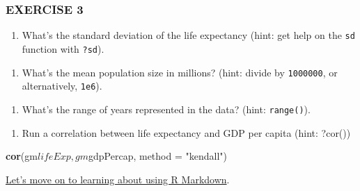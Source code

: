 \documentclass[]{article}
\newenvironment{Shaded}{\begin{snugshade}}{\end{snugshade}}
\newcommand{\KeywordTok}[1]{\textcolor[rgb]{0.13,0.29,0.53}{\textbf{{#1}}}}
\newcommand{\DataTypeTok}[1]{\textcolor[rgb]{0.13,0.29,0.53}{{#1}}}
\newcommand{\FloatTok}[1]{\textcolor[rgb]{0.00,0.00,0.81}{{#1}}}
\newcommand{\StringTok}[1]{\textcolor[rgb]{0.31,0.60,0.02}{{#1}}}
\newcommand{\OtherTok}[1]{\textcolor[rgb]{0.56,0.35,0.01}{{#1}}}
\newcommand{\NormalTok}[1]{{#1}}
\providecommand{\tightlist}{%
  \setlength{\itemsep}{0pt}\setlength{\parskip}{0pt}}
\begin{document}
\subsubsection{EXERCISE 3}\label{exercise-3}

\begin{enumerate}
\def\labelenumi{\arabic{enumi}.}
\tightlist
\item
  What's the standard deviation of the life expectancy (hint: get help
  on the \texttt{sd} function with \texttt{?sd}).
\end{enumerate}

\begin{Shaded}
\end{Shaded}

\begin{enumerate}
\def\labelenumi{\arabic{enumi}.}
\setcounter{enumi}{1}
\tightlist
\item
  What's the mean population size in millions? (hint: divide by
  \texttt{1000000}, or alternatively, \texttt{1e6}).
\end{enumerate}

\begin{Shaded}
\end{Shaded}

\begin{enumerate}
\def\labelenumi{\arabic{enumi}.}
\setcounter{enumi}{2}
\tightlist
\item
  What's the range of years represented in the data? (hint:
  \texttt{range()}).
\end{enumerate}

\begin{Shaded}
\end{Shaded}

\begin{enumerate}
\def\labelenumi{\arabic{enumi}.}
\setcounter{enumi}{3}
\tightlist
\item
  Run a correlation between life expectancy and GDP per capita (hint:
  ?cor())
\end{enumerate}

\begin{Shaded}
\begin{Highlighting}[]
 \KeywordTok{cor}\NormalTok{(gm$lifeExp, gm$gdpPercap, }\DataTypeTok{method =} \StringTok{"kendall"}\NormalTok{)}
\end{Highlighting}
\end{Shaded}

\href{Week_1_RMarkdown.html}{Let's move on to learning about using R
Markdown}.
\end{document}
